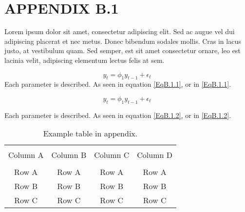 \chapter{APPENDIX B.1}
\renewcommand{\theequation}{B.1.\arabic{equation}}
\setcounter{equation}{0}

Lorem ipsum dolor sit amet, consectetur adipiscing elit. Sed ac augue vel dui adipiscing placerat et nec metus. Donec bibendum sodales mollis. Cras in lacus justo, at vestibulum quam. Sed semper, est sit amet consectetur ornare, leo est lacinia velit, adipiscing elementum lectus felis at sem.

\begin{equation}
y_{t} = \phi_{1} y_{t-1} + \epsilon_{t}
\label{EqB.1.1}
\end{equation}
Each parameter is described. As seen in equation \eqref{EqB.1.1}, or in \ref{EqB.1.1}.

\begin{equation}
y_{t} = \phi_{1} y_{t-1} + \epsilon_{t}
\label{EqB.1.2}
\end{equation}

Each parameter is described. As seen in equation \eqref{EqB.1.2}, or in \ref{EqB.1.2}.

\begin{table*}[!ht]
	{\setlength{\tabcolsep}{14pt}
		\caption{Example table in appendix.}
		\begin{center}
			\vspace{-6mm}
			\begin{tabular}{cccc}
				\hline \\[-2.45ex] \hline \\[-2.1ex]
				Column A & Column B & Column C & Column D \\
				\hline \\[-1.8ex]
				Row A & Row A & Row A & Row A \\
				Row B & Row B & Row B & Row B \\
				Row C & Row C & Row C & Row C \\
				[-0ex] \hline
			\end{tabular}
			\vspace{-6mm}
		\end{center}
		\label{TableB.1}}
\end{table*}